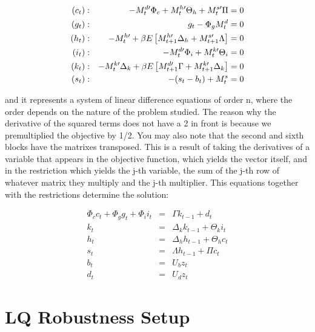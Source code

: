 \documentclass[letter, fleqn, 11pt]{article}
\begin{document}
\begin{eqnarray*}
\left( c_{t}\right)  &:&-{\scriptsize M}_{t}^{d\prime }\Phi _{c}+%
{\scriptsize M}_{t}^{h\prime }\Theta _{h}+{\scriptsize M}_{t}^{s\prime }\Pi
=0 \\
\left( g_{t}\right)  &:&g_{t}-\Phi _{g}{\scriptsize M}_{t}^{d}=0 \\
\left( h_{t}\right)  &:&-{\scriptsize M}_{t}^{h\prime }+\beta E\left[
{\scriptsize M}_{t+1}^{h\prime }\Delta _{h}+{\scriptsize M}_{t+1}^{s\prime
}\Lambda \right] =0 \\
\left( i_{t}\right)  &:&-{\scriptsize M}_{t}^{d\prime }\Phi _{i}+%
{\scriptsize M}_{t}^{k\prime }\Theta _{i}=0 \\
\left( k_{t}\right)  &:&-{\scriptsize M}_{t}^{k\prime }\Delta _{k}+\beta E%
\left[ {\scriptsize M}_{t+1}^{d\prime }\Gamma +{\scriptsize M}%
_{t+1}^{k\prime }\Delta _{k}\right] =0 \\
\left( s_{t}\right)  &:&-(s_{t}-b_{t})+{\scriptsize M}_{t}^{s}=0
\end{eqnarray*}

and it represents a system of linear difference equations of order n, where the order depends on the nature of the problem studied. The reason
why the derivative of the squared terms does not have a 2 in front is because we premultiplied the objective by 1/2. You may also note that the
second and sixth blocks have the matrixes transposed. This is a result of taking the derivatives of a variable that appears in the objective
function, which yields the vector itself, and in the restriction which yields the j-th variable, the sum of the j-th row of whatever matrix they
multiply and the j-th multiplier. This equations together with the restrictions determine the solution:

\begin{eqnarray*}
\Phi _{c}c_{t}+\Phi _{g}g_{t}+\Phi _{i}i_{t} &=&\Gamma k_{t-1}+d_{t} \\
k_{t} &=&\Delta _{k}k_{t-1}+\Theta _{k}i_{t} \\
h_{t} &=&\Delta _{h}h_{t-1}+\Theta _{h}c_{t} \\
s_{t} &=&\Lambda h_{t-1}+\Pi c_{t} \\
b_{t} &=&U_{b}z_{t} \\
d_{t} &=&U_{d}z_{t}
\end{eqnarray*}

\section{LQ Robustness Setup}
\end{document}

